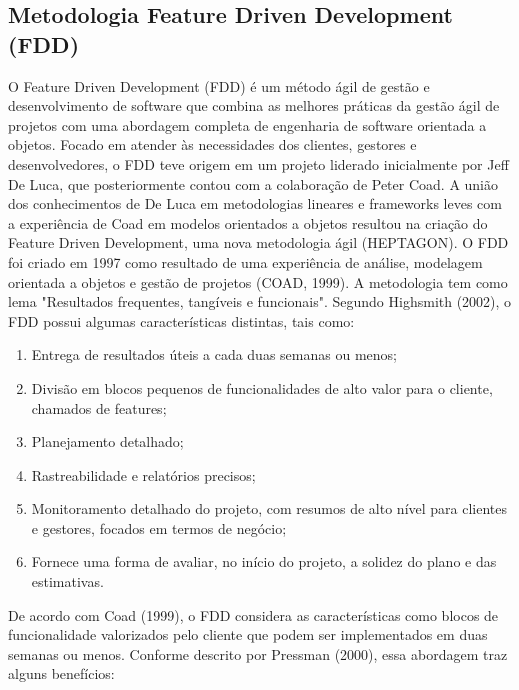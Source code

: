 \subsection{Metodologia Feature Driven Development (FDD)}
O Feature Driven Development (FDD) é um método ágil de gestão e desenvolvimento de software que combina as melhores práticas da gestão ágil de projetos com uma abordagem completa de engenharia de software orientada a objetos. Focado em atender às necessidades dos clientes, gestores e desenvolvedores, o FDD teve origem em um projeto liderado inicialmente por Jeff De Luca, que posteriormente contou com a colaboração de Peter Coad. A união dos conhecimentos de De Luca em metodologias lineares e frameworks leves com a experiência de Coad em modelos orientados a objetos resultou na criação do Feature Driven Development, uma nova metodologia ágil (HEPTAGON).
O FDD foi criado em 1997 como resultado de uma experiência de análise, modelagem orientada a objetos e gestão de projetos (COAD, 1999). A metodologia tem como lema "Resultados frequentes, tangíveis e funcionais". Segundo Highsmith (2002), o FDD possui algumas características distintas, tais como:

\begin{enumerate}
	\item Entrega de resultados úteis a cada duas semanas ou menos;
	\item Divisão em blocos pequenos de funcionalidades de alto valor para o cliente, chamados de features;
	\item Planejamento detalhado;
	\item Rastreabilidade e relatórios precisos;
	\item Monitoramento detalhado do projeto, com resumos de alto nível para clientes e gestores, focados em termos de negócio;
	\item Fornece uma forma de avaliar, no início do projeto, a solidez do plano e das estimativas.
\end{enumerate}

De acordo com Coad (1999), o FDD considera as características como blocos de funcionalidade valorizados pelo cliente que podem ser implementados em duas semanas ou menos. Conforme descrito por Pressman (2000), essa abordagem traz alguns benefícios:


